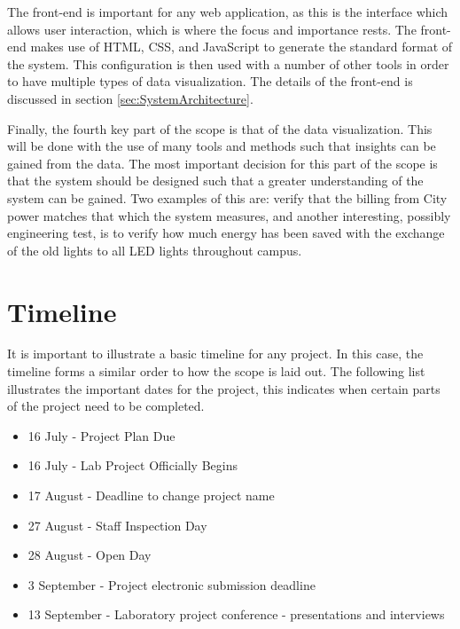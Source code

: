 \documentclass[12pt,onecolumn]{IEEEtran}
\begin{document}
The front-end is important for any web application, as this is the interface which allows user interaction, which is where the focus and importance rests. The front-end makes use of HTML, CSS, and JavaScript to generate the standard format of the system. This configuration is then used with a number of other tools in order to have multiple types of data visualization.
The details of the front-end is discussed in section \ref{sec:SystemArchitecture}.

Finally, the fourth key part of the scope is that of the data visualization. This will be done with the use of many tools and methods such that insights can be gained from the data. The most important decision for this part of the scope is that the system should be designed such that a greater understanding of the system can be gained. Two examples of this are: verify that the billing from City power matches that which the system measures, and another interesting, possibly engineering test, is to verify how much energy has been saved with the exchange of the old lights to all LED lights throughout campus. 




\section{Timeline} \label{sec:Timeline}
It is important to illustrate a basic timeline for any project. In this case, the timeline forms a similar order to how the scope is laid out. 
The following list illustrates the important dates for the project, this indicates when certain parts of the project need to be completed. 

\begin{itemize}
    \item 16 July - Project Plan Due
    \item 16 July - Lab Project Officially Begins
    \item 17 August - Deadline to change project name
    \item 27 August - Staff Inspection Day
    \item 28 August - Open Day
    \item 3 September - Project electronic submission deadline
    \item 13 September - Laboratory project conference - presentations and interviews
\end{itemize}
\end{document}
